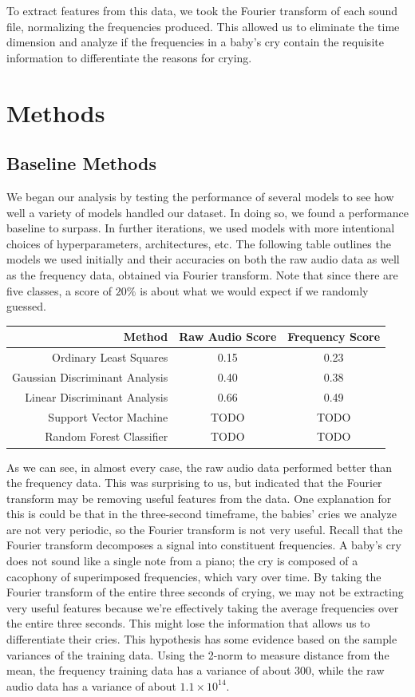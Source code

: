 \documentclass[11pt]{article}
\begin{document}
To extract features from this data, we took the Fourier transform of each sound file, normalizing the frequencies produced.
This allowed us to eliminate the time dimension and analyze if the frequencies in a baby's cry contain the requisite information to differentiate the reasons for crying.


\section{Methods}
\subsection{Baseline Methods}
We began our analysis by testing the performance of several models to see how well a variety of models handled our dataset.
In doing so, we found a performance baseline to surpass.
In further iterations, we used models with more intentional choices of hyperparameters, architectures, etc.
The following table outlines the models we used initially and their accuracies on both the raw audio data as well as the frequency data, obtained via Fourier transform.
Note that since there are five classes, a score of $20\%$ is about what we would expect if we randomly guessed.
\begin{center}
   \begin{tabular}{| r | c | c |}
      \hline
      \textbf{Method} & \textbf{Raw Audio Score} & \textbf{Frequency Score}  \\
      \hline
      Ordinary Least Squares & 0.15 & 0.23 \\
      Gaussian Discriminant Analysis & 0.40 & 0.38 \\
      Linear Discriminant Analysis & 0.66 & 0.49 \\
      Support Vector Machine & TODO &  TODO\\
      Random Forest Classifier & TODO & TODO\\
      \hline
   \end{tabular}
\end{center}
As we can see, in almost every case, the raw audio data performed better than the frequency data.
This was surprising to us, but indicated that the Fourier transform may be removing useful features from the data.
One explanation for this is could be that in the three-second timeframe, the babies' cries we analyze are not very periodic, so the Fourier transform is not very useful.
Recall that the Fourier transform decomposes a signal into constituent frequencies.
A baby's cry does not sound like a single note from a piano; the cry is composed of a cacophony of superimposed frequencies, which vary over time.
By taking the Fourier transform of the entire three seconds of crying, we may not be extracting very useful features because we're effectively taking the average frequencies over the entire three seconds.
This might lose the information that allows us to differentiate their cries.
This hypothesis has some evidence based on the sample variances of the training data.
Using the 2-norm to measure distance from the mean, the frequency training data has a variance of about $ 300 $, while the raw audio data has a variance of about $ 1.1 \times 10^{14} $.
\end{document}
